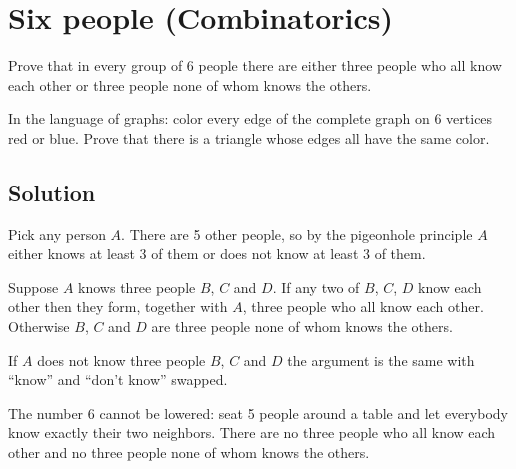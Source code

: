 \section {Six people (Combinatorics)}

Prove that in every group of 6 people there are either three people who all know each other or three people none of whom knows the others.

In the language of graphs: color every edge of the complete graph on 6 vertices red or blue.
Prove that there is a triangle whose edges all have the same color.

\subsection{Solution}

Pick any person $A$. There are 5 other people, so by the pigeonhole principle $A$ either knows at least 3 of them or does not know at least 3 of them.

Suppose $A$ knows three people $B$, $C$ and $D$. If any two of $B$, $C$, $D$ know each other then they form, together with $A$,
three people who all know each other. Otherwise $B$, $C$ and $D$ are three people none of whom knows the others.

If $A$ does not know three people $B$, $C$ and $D$ the argument is the same with ``know'' and ``don't know'' swapped.

The number 6 cannot be lowered: seat 5 people around a table and let everybody know exactly their two neighbors.
There are no three people who all know each other and no three people none of whom knows the others.
